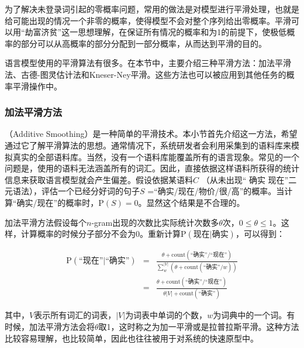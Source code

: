 \parinterval 为了解决未登录词引起的零概率问题，常用的做法是对模型进行平滑处理，也就是给可能出现的情况一个非零的概率，使得模型不会对整个序列给出零概率。平滑可以用``劫富济贫''这一思想理解，在保证所有情况的概率和为1的前提下，使极低概率的部分可以从高概率的部分分配到一部分概率，从而达到平滑的目的。

\parinterval 语言模型使用的平滑算法有很多。在本节中，主要介绍三种平滑方法：加法平滑法、古德-图灵估计法和Kneser-Ney平滑。这些方法也可以被应用到其他任务的概率平滑操作中。


\subsubsection{加法平滑方法}

（Additive Smoothing）是一种简单的平滑技术。本小节首先介绍这一方法，希望通过它了解平滑算法的思想。通常情况下，系统研发者会利用采集到的语料库来模拟真实的全部语料库。当然，没有一个语料库能覆盖所有的语言现象。常见的一个问题是，使用的语料无法涵盖所有的词汇。因此，直接依据这样语料所获得的统计信息来获取语言模型就会产生偏差。假设依据某语料$C$ （从未出现`` 确实 现在''二元语法），评估一个已经分好词的句子$S$ =``确实/现在/物价/很/高''的概率。当计算``确实/现在''的概率时，$\textrm{P}(S) = 0$。显然这个结果是不合理的。

\parinterval 加法平滑方法假设每个$n$-gram出现的次数比实际统计次数多$\theta$次，$0 \le \theta\le 1$。这样，计算概率的时候分子部分不会为0。重新计算$\textrm{P}(\textrm{现在}|\textrm{确实})$，可以得到：

\begin{eqnarray}
\textrm{P}(\textrm{``现在''}|\textrm{``确实''}) & =  & \frac{\theta + \textrm{count}(\textrm{``确实''/``现在''})}{\sum_{w}^{|V|}(\theta + \textrm{count}(\textrm{``确实''/}w))} \nonumber \\
                                                             & =  & \frac{\theta + \textrm{count}(\textrm{``确实''/``现在''})}{\theta{|V|} + \textrm{count}(\textrm{``确实''})}
\label{eq:2-27}
\end{eqnarray}

\noindent 其中，$V$表示所有词汇的词表，$|V|$为词表中单词的个数，$w$为词典中的一个词。有时候，加法平滑方法会将$\theta$取1，这时称之为加一平滑或是拉普拉斯平滑。这种方法比较容易理解，也比较简单，因此也往往被用于对系统的快速原型中。

